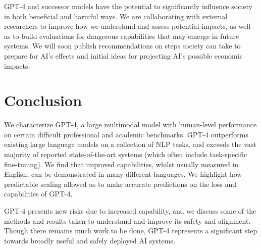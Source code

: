 GPT-4 and successor models have the potential to significantly influence society in both beneficial and harmful ways. We are collaborating with external researchers to improve how we understand and assess potential impacts, as well as to build evaluations for dangerous capabilities that may emerge in future systems. We will soon publish recommendations on steps society can take to prepare for AI's effects and initial ideas for projecting AI's possible economic impacts.

\section{Conclusion}

We characterize GPT-4, a large multimodal model with human-level performance on certain difficult professional and academic benchmarks. GPT-4 outperforms existing large language models on a collection of NLP tasks, and exceeds the vast majority of reported state-of-the-art systems (which often include task-specific fine-tuning). We find that improved capabilities, whilst usually measured in English, can be demonstrated in many different languages. We highlight how predictable scaling allowed us to make accurate predictions on the loss and capabilities of GPT-4. 

GPT-4 presents new risks due to increased capability, and we discuss some of the methods and results taken to understand and improve its safety and alignment. Though there remains much work to be done, GPT-4 represents a significant step towards broadly useful and safely deployed AI systems.


